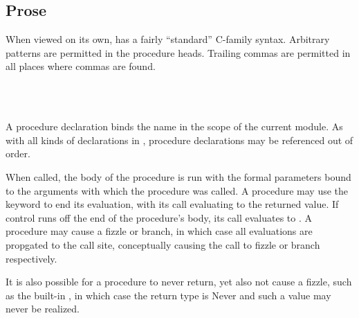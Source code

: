 \subsection{Prose}

When viewed on its own, \Prose{} has a fairly ``standard'' C-family syntax.
Arbitrary patterns are permitted in the procedure heads.
Trailing commas are permitted in all places where commas are found.

\begin{bnf*}
     \\
     \\
\end{bnf*}

\noindent A procedure declaration binds the name in the scope of the current module.
As with all kinds of declarations in \Trilogy{}, procedure declarations may be
referenced out of order.

When called, the body of the procedure is run with the formal parameters bound to
the arguments with which the procedure was called. A procedure may use the 
keyword to end its evaluation, with its call evaluating to the returned value.
If control runs off the end of the procedure's body, its call evaluates to .
A procedure may cause a fizzle or branch, in which case all evaluations are propgated
to the call site, conceptually causing the call to fizzle or branch respectively.

It is also possible for a procedure to never return, yet also not cause a fizzle,
such as the built-in , in which case the return type is Never and such a
value may never be realized.

\begin{prooftree}
\end{prooftree}

\begin{prooftree}
\end{prooftree}

